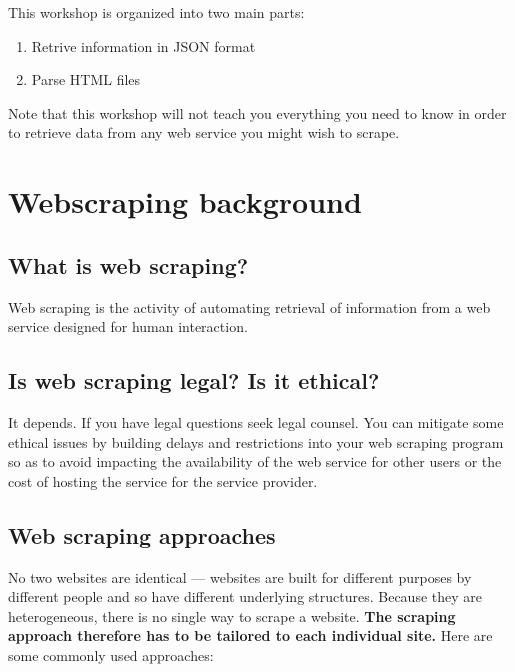 \documentclass[
]{book}
\providecommand{\tightlist}{%
  \setlength{\itemsep}{0pt}\setlength{\parskip}{0pt}}
\begin{document}
This workshop is organized into two main parts:

\begin{enumerate}
\def\labelenumi{\arabic{enumi}.}
\tightlist
\item
  Retrive information in JSON format
\item
  Parse HTML files
\end{enumerate}

Note that this workshop will not teach you everything you need to know in
order to retrieve data from any web service you might wish to scrape.

\hypertarget{webscraping-background}{%
\section{Webscraping background}\label{webscraping-background}}

\hypertarget{what-is-web-scraping}{%
\subsection{What is web scraping?}\label{what-is-web-scraping}}

Web scraping is the activity of automating retrieval of information
from a web service designed for human interaction.

\hypertarget{is-web-scraping-legal-is-it-ethical}{%
\subsection{Is web scraping legal? Is it ethical?}\label{is-web-scraping-legal-is-it-ethical}}

It depends. If you have legal questions seek legal counsel. You can
mitigate some ethical issues by building delays and restrictions into
your web scraping program so as to avoid impacting the availability of
the web service for other users or the cost of hosting the service for
the service provider.

\hypertarget{web-scraping-approaches}{%
\subsection{Web scraping approaches}\label{web-scraping-approaches}}

No two websites are identical --- websites are built for different purposes by different people
and so have different underlying structures. Because they are heterogeneous, there is no single way to
scrape a website. \textbf{The scraping approach therefore has to be tailored to each individual site.}
Here are some commonly used approaches:
\end{document}
